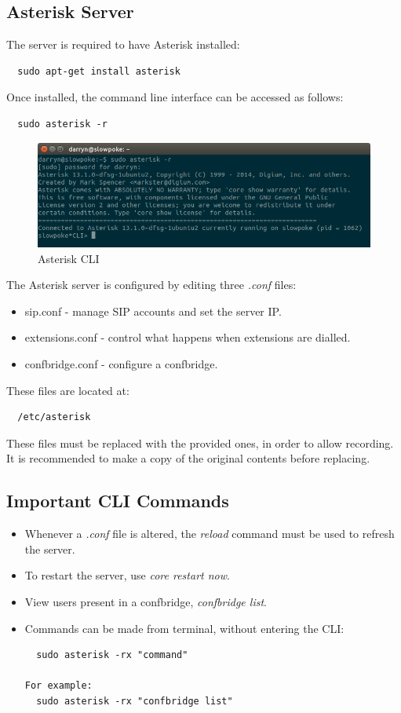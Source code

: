 \documentclass[a4paper,11pt]{report}
\begin{document}
\subsection{Asterisk Server}
The server is required to have Asterisk installed:
\begin{lstlisting}
  sudo apt-get install asterisk
\end{lstlisting}
Once installed, the command line interface can be accessed as follows:
\begin{lstlisting}
  sudo asterisk -r
\end{lstlisting}
\begin{figure}[h]
  \begin{center}
    \includegraphics[scale = 0.4]{asterisk_cli}
    \caption{Asterisk CLI}
  \end{center}
\end{figure}
The Asterisk server is configured by editing three \textit{.conf} files: 
\begin{itemize}
   \item sip.conf - manage SIP accounts and set the server IP.
   \item extensions.conf - control what happens when extensions are dialled.
   \item confbridge.conf - configure a confbridge.
 \end{itemize} 
These files are located at:
\begin{lstlisting}
  /etc/asterisk
\end{lstlisting}
These files must be replaced with the provided ones, in order to allow recording. It is recommended to make a copy of the original contents before replacing.

\subsection{Important CLI Commands}
\begin{itemize}
  \item Whenever a \textit{.conf} file is altered, the \textit{reload} command must be used to refresh the server.
  \item To restart the server, use \textit{core restart now}.
  \item View users present in a confbridge, \textit{confbridge list}. 
  \item Commands can be made from terminal, without entering the CLI:
\begin{lstlisting}
  sudo asterisk -rx "command"
  
For example:
  sudo asterisk -rx "confbridge list"
\end{lstlisting} 
\end{itemize}
\end{document}
